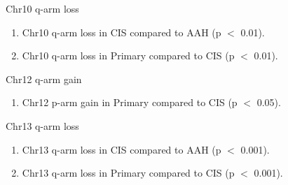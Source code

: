 \documentclass{beamer}
\begin{document}
\begin{frame}[allowframebreaks]
                \begin{block}{Chr10 q-arm loss}
                    \begin{enumerate}
                        \item Chr10 q-arm loss in CIS compared to AAH (p $<$ 0.01).
                        \item Chr10 q-arm loss in Primary compared to CIS (p $<$ 0.01).
                    \end{enumerate}

                    \begin{table}
                        \caption{CGC Tier1 genes in Chr10 q-arm}
                        \resizebox{\linewidth}{!}
                        {}
                    \end{table}
                \end{block}

                \begin{block}{Chr12 q-arm gain}
                    \begin{enumerate}
                        \item Chr12 p-arm gain in Primary compared to CIS (p $<$ 0.05).
                    \end{enumerate}

                    \begin{table}
                        \caption{CGC Tier1 genes in Chr12 p-arm}
                        \resizebox{\linewidth}{!}
                        {}
                    \end{table}
                \end{block}

                \begin{block}{Chr13 q-arm loss}
                    \begin{enumerate}
                        \item Chr13 q-arm loss in CIS compared to AAH (p $<$ 0.001).
                        \item Chr13 q-arm loss in Primary compared to CIS (p $<$ 0.001).
                    \end{enumerate}

                    \begin{table}
                        \caption{CGC Tier1 genes in Chr13 q-arm}
                        \resizebox{\linewidth}{!}
                        {}
                    \end{table}
                \end{block}


\end{frame}
\end{document}

